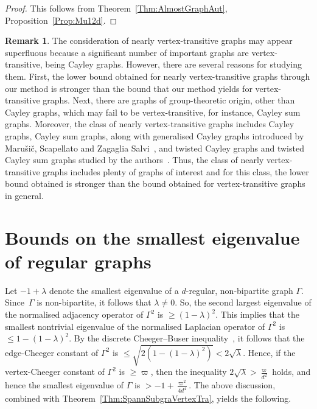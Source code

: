 \documentclass[10pt]{article}
\theoremstyle{definition}
\newtheorem{remark}[theorem]{Remark}
\begin{document}
\begin{proof}
This follows from Theorem~\ref{Thm:AlmostGraphAut}, Proposition~\ref{Prop:Mu12d}. 
\end{proof}

\begin{remark}
\label{Rk:NearlyVertexTra}
The consideration of nearly vertex-transitive graphs may appear superfluous because a significant number of important graphs are vertex-transitive, being Cayley graphs. However, there are several reasons for studying them. First, the lower bound obtained for nearly vertex-transitive graphs through our method is stronger than the bound that our method yields for vertex-transitive graphs. Next, there are graphs of group-theoretic origin, other than Cayley graphs, which may fail to be vertex-transitive, for instance, Cayley sum graphs. Moreover, the class of nearly vertex-transitive graphs includes Cayley graphs, Cayley sum graphs, along with generalised Cayley graphs introduced by Maru\v{s}i\v{c}, Scapellato and Zagaglia Salvi~\cite{MarusicScapellatoZagagliaSalviGeneralizedCayleyGraph}, and twisted Cayley graphs and twisted Cayley sum graphs studied by the authors~\cite{CheegerTwisted}. Thus, the class of nearly vertex-transitive graphs includes plenty of graphs of interest and for this class, the lower bound obtained is stronger than the bound obtained for vertex-transitive graphs in general. 
\end{remark}

\section{Bounds on the smallest eigenvalue of regular graphs} 

Let $-1+\lambda$ denote the smallest eigenvalue of a $d$-regular, non-bipartite graph $\Gamma$. Since~$\Gamma$ is non-bipartite, it follows that $\lambda \neq 0$. So, the second largest eigenvalue of the normalised adjacency operator of $\Gamma^2$ is $\geq (1- \lambda)^2$. This implies that the smallest nontrivial eigenvalue of the normalised Laplacian operator of $\Gamma^2$ is $\leq 1 - (1-\lambda)^2$. By the discrete Cheeger--Buser inequality~\cite[Theorem 2.2]{ChungSpectralGraphTheory}, it follows that the edge-Cheeger constant of $\Gamma^2$ is $\leq \sqrt {2 (1 - (1-\lambda)^2)} < 2\sqrt \lambda$. Hence, if the vertex-Cheeger constant of $\Gamma^2$ is $\geq \varpi$, then the inequality $2 \sqrt \lambda > \frac{\varpi}{d^2}$ holds, and hence the smallest eigenvalue of $\Gamma$ is $> -1 + \frac {\varpi^2}{4d^4}$. 
The above discussion, combined with Theorem~\ref{Thm:SpannSubgraVertexTra}, yields the following. 
\end{document}
